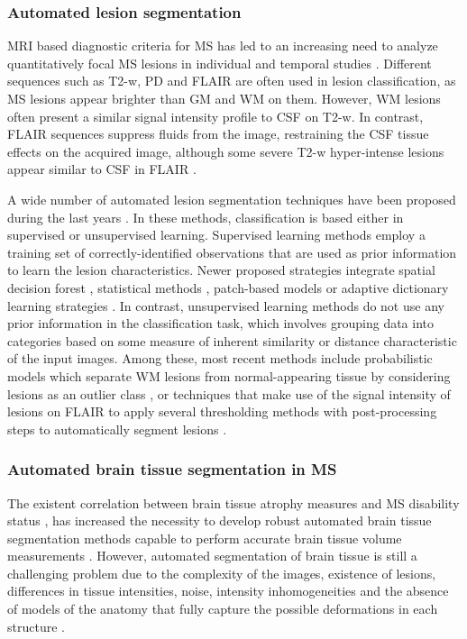 \subsubsection{Automated lesion segmentation}

MRI based diagnostic criteria for MS has led to an increasing need to analyze quantitatively focal MS lesions in individual and temporal studies \cite{Cabezas2014, Polman2011}. Different sequences such as T2-w, PD and FLAIR are often used in lesion classification, as MS lesions appear brighter than GM and WM on them. However, WM lesions often present a similar signal intensity profile to CSF on T2-w. In contrast, FLAIR sequences suppress fluids from the image, restraining the CSF tissue effects on the acquired image, although some severe T2-w hyper-intense lesions appear similar to CSF in FLAIR \cite{Harmouche2015}. 

A wide number of automated lesion segmentation techniques have been proposed during the last years \cite{Garcia-Lorenzo2013, Llado2012}. In these methods, classification is based either in supervised or unsupervised learning. Supervised learning methods employ a training set of correctly-identified observations that are used as prior information to learn the lesion characteristics. Newer proposed strategies integrate spatial decision forest \cite{Geremia2011}, statistical methods \cite{Sweeney2013}, patch-based models \cite{Guizard2015} or adaptive dictionary learning strategies \cite{Deshpande2015}. In contrast, unsupervised learning methods do not use any prior information in the classification task, which involves grouping data into categories based on some measure of inherent similarity or distance characteristic of the input images. Among these, most recent methods include probabilistic models which separate WM lesions from normal-appearing tissue by considering lesions as an outlier class \cite{Harmouche2015,Jain2015,Tomas-Fernandez2015}, or techniques that make use of the signal intensity of lesions on FLAIR to apply several thresholding methods with post-processing steps to automatically segment lesions \cite{Roura2015, Schmidt2012}. 


\subsubsection{Automated brain tissue segmentation in MS}
\label{subsec:lesion_segmentation}
The existent correlation between brain tissue atrophy measures and MS disability status \cite{Filippi2013, Fisher2008}, has increased the necessity to develop robust automated brain tissue segmentation methods capable to perform accurate brain tissue volume measurements \cite{Giorgio2013}. However, automated segmentation of brain tissue is still a challenging problem due to the complexity of the images, existence of lesions, differences in tissue intensities, noise, intensity inhomogeneities and the absence of models of the anatomy that fully capture the possible deformations in each structure \cite{Cabezas2011, Kapur1996}. 

